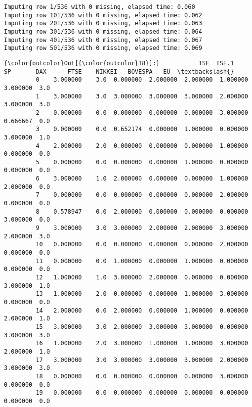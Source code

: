 \documentclass[11pt]{article}
\begin{document}
    \begin{Verbatim}[commandchars=\\\{\}]
Imputing row 1/536 with 0 missing, elapsed time: 0.060
Imputing row 101/536 with 0 missing, elapsed time: 0.062
Imputing row 201/536 with 0 missing, elapsed time: 0.063
Imputing row 301/536 with 0 missing, elapsed time: 0.064
Imputing row 401/536 with 0 missing, elapsed time: 0.067
Imputing row 501/536 with 0 missing, elapsed time: 0.069

    \end{Verbatim}

\begin{Verbatim}[commandchars=\\\{\}]
{\color{outcolor}Out[{\color{outcolor}18}]:}           ISE  ISE.1        SP       DAX      FTSE    NIKKEI   BOVESPA   EU  \textbackslash{}
         0    3.000000    3.0  0.000000  2.000000  2.000000  1.000000  3.000000  3.0   
         1    3.000000    3.0  3.000000  3.000000  3.000000  2.000000  3.000000  3.0   
         2    0.000000    0.0  0.000000  0.000000  0.000000  3.000000  0.666667  0.0   
         3    0.000000    0.0  0.652174  0.000000  1.000000  0.000000  3.000000  1.0   
         4    2.000000    2.0  0.000000  0.000000  0.000000  1.000000  0.000000  0.0   
         5    0.000000    0.0  0.000000  0.000000  1.000000  0.000000  0.000000  0.0   
         6    3.000000    1.0  2.000000  0.000000  0.000000  1.000000  2.000000  0.0   
         7    0.000000    0.0  0.000000  0.000000  0.000000  2.000000  0.000000  0.0   
         8    0.578947    0.0  2.000000  0.000000  0.000000  0.000000  3.000000  0.0   
         9    3.000000    3.0  3.000000  2.000000  2.000000  3.000000  2.000000  3.0   
         10   0.000000    0.0  0.000000  0.000000  0.000000  2.000000  0.000000  0.0   
         11   0.000000    0.0  1.000000  0.000000  1.000000  0.000000  0.000000  0.0   
         12   1.000000    1.0  3.000000  2.000000  0.000000  0.000000  3.000000  1.0   
         13   1.000000    2.0  0.000000  0.000000  1.000000  3.000000  0.000000  0.0   
         14   2.000000    0.0  2.000000  0.000000  1.000000  0.000000  2.000000  1.0   
         15   3.000000    3.0  2.000000  3.000000  3.000000  0.000000  3.000000  3.0   
         16   1.000000    2.0  3.000000  1.000000  1.000000  3.000000  2.000000  1.0   
         17   3.000000    3.0  3.000000  3.000000  3.000000  2.000000  3.000000  3.0   
         18   0.000000    0.0  0.000000  0.000000  0.000000  3.000000  0.000000  0.0   
         19   0.000000    0.0  0.000000  0.000000  0.000000  0.000000  0.000000  0.0   

\end{Verbatim}
\end{document}
